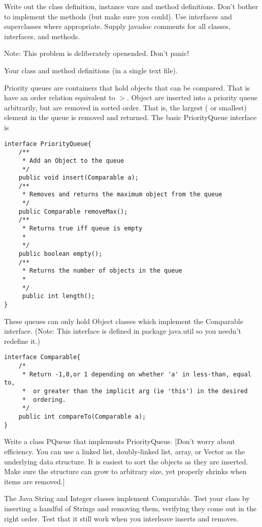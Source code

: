 \documentclass{article}
\newcounter{problem}
\newcommand {\problem}[1]{\bigskip\noindent{\large\bf Problem \stepcounter{problem} \arabic{problem}: {#1}}}
\begin{document}
Write out the class definition, instance vars and method definitions. Don't
bother to implement the methods (but make sure you could).
Use interfaces and superclasses where appropriate. Supply javadoc comments
for all classes, interfaces, and methods.

Note: This problem is deliberately open\-ended. Don't panic!


 Your class and method definitions (in a single text file).

\problem{Priority Queue}

Priority queues are containers that hold objects that can be compared. That is
have an order relation equivalent to $>$. Object are inserted into a
priority queue arbitrarily, but are removed in sorted order. That is,
the largest ( or smallest) element in the queue is removed and returned.
The basic PriorityQueue interface is
\begin{verbatim}
interface PriorityQueue{
    /**
     * Add an Object to the queue
     */
    public void insert(Comparable a);
    /**
     * Removes and returns the maximum object from the queue
     */
    public Comparable removeMax();
    /**
     * Returns true iff queue is empty
     * 
     */
    public boolean empty();
    /**
     * Returns the number of objects in the queue
     * 
     */
     public int length();
}
\end{verbatim}

These queues can only hold Object classes which implement the 
Comparable interface. (Note: This interface is defined in package 
java.util so you needn't redefine it.)
\begin{verbatim}
interface Comparable{
    /*
     * Return -1,0,or 1 depending on whether 'a' in less-than, equal to,
     *  or greater than the implicit arg (ie 'this') in the desired
     *  ordering.
     */
    public int compareTo(Comparable a);
}
\end{verbatim}

Write a class PQueue that implements PriorityQueue. [Don't worry about
efficiency. You can use a linked list, doubly-linked list, array, or
Vector as the underlying data structure. It is easiest to sort the objects
as they are inserted. Make sure the structure
can grow to arbitrary size, yet properly shrinks when items are removed.]

The Java String and Integer classes implement Comparable.
Test your class by inserting a handful of Strings and removing them,
verifying they come out in the right order. Test that it still
work when you interleave inserts and removes.
\end{document}
